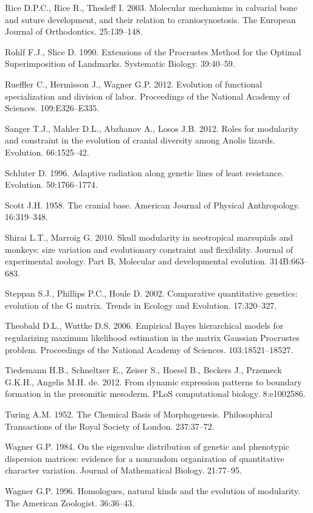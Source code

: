 \documentclass[12pt,]{article}
\begin{document}
Rice D.P.C., Rice R., Thesleff I. 2003. Molecular mechanisms in
calvarial bone and suture development, and their relation to
craniosynostosis. The European Journal of Orthodontics. 25:139--148.

Rohlf F.J., Slice D. 1990. Extensions of the Procrustes Method for the
Optimal Superimposition of Landmarks. Systematic Biology. 39:40--59.

Rueffler C., Hermisson J., Wagner G.P. 2012. Evolution of functional
specialization and division of labor. Proceedings of the National
Academy of Sciences. 109:E326--E335.

Sanger T.J., Mahler D.L., Abzhanov A., Losos J.B. 2012. Roles for
modularity and constraint in the evolution of cranial diversity among
Anolis lizards. Evolution. 66:1525--42.

Schluter D. 1996. Adaptive radiation along genetic lines of least
resistance. Evolution. 50:1766--1774.

Scott J.H. 1958. The cranial base. American Journal of Physical
Anthropology. 16:319--348.

Shirai L.T., Marroig G. 2010. Skull modularity in neotropical marsupials
and monkeys: size variation and evolutionary constraint and flexibility.
Journal of experimental zoology. Part B, Molecular and developmental
evolution. 314B:663--683.

Steppan S.J., Phillips P.C., Houle D. 2002. Comparative quantitative
genetics: evolution of the G matrix. Trends in Ecology and Evolution.
17:320--327.

Theobald D.L., Wuttke D.S. 2006. Empirical Bayes hierarchical models for
regularizing maximum likelihood estimation in the matrix Gaussian
Procrustes problem. Proceedings of the National Academy of Sciences.
103:18521--18527.

Tiedemann H.B., Schneltzer E., Zeiser S., Hoesel B., Beckers J.,
Przemeck G.K.H., Angelis M.H. de. 2012. From dynamic expression patterns
to boundary formation in the presomitic mesoderm. PLoS computational
biology. 8:e1002586.

Turing A.M. 1952. The Chemical Basis of Morphogenesis. Philosophical
Transactions of the Royal Society of London. 237:37--72.

Wagner G.P. 1984. On the eigenvalue distribution of genetic and
phenotypic dispersion matrices: evidence for a nonrandom organization of
quantitative character variation. Journal of Mathematical Biology.
21:77--95.

Wagner G.P. 1996. Homologues, natural kinds and the evolution of
modularity. The American Zoologist. 36:36--43.
\end{document}
